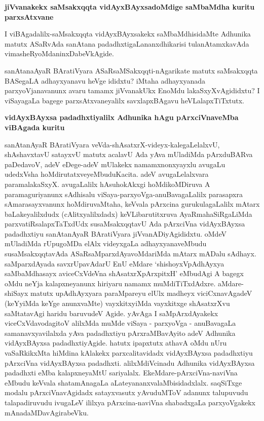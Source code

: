 {\bigskip
\noindent
{\large\bf jiVvanakekx saMsakxqqta vidAyxBAyxsadoMdige saMbaMdha kuritu parxsAtxvane}}\label{page38}
\medskip

\noindent
I viBAgadalilx-saMsakxqqta vidAyxBAyxsakekx saMbaMdhisidaMte Adhunika matutx ASaRvAda sanAtana padadhxti\-gaLa\-nanxdhi\-karisi tulanAtamxkavAda vimasheRyoMdaninxDabeVkAgide.

sanAtanaAyaR BAratiVyara ASaRsaMSakxqqti-nAgarikate matutx saMsakxqqta BASegaLA adhayxyanavu heVge ididxtu? iMtaha adhayxyanada parxyoVjanavanunx avaru tamamx jiVvanakUkx EnoMdu lakaSxyXvAgididxtu? I viSayagaLa bagege parxsAtxvaneyalilx savxlapxBAgavu heVLalapxTiTxtutx.

{\bigskip
\noindent
{\large\bf vidAyxBAyxsa padadhxtiyalilx Adhunika hAgu pArxciVnaveMba viBAgada kuritu}}\label{page38}
\medskip

\noindent
sanAtanAyaR BAratiVyara veVda-shAsatxrX-videyx-kalegaLelalxvU, shAshavxtavU satayxvU matutx acalavU Ada yAva mUladiMda pArxduBARva paDedavoV, adeV eDege\--adeV mUlakekx namamxnonxyayxlu avu\-gaLu udedxVsha hoMdirutatxveyeMbudu\break Kacita. adeV avugaLelalxvara paramalakaSxyX. avugaLalilx hAsu\-hokAkxgi hoMdikoMDi\-ruva A paramaguriyanunx sAdhisalu viSaya-parxyoVga-anuBavagaLalilx para\-sapxra sAma\-rasayx\-vanunx hoMdiruvaMtaha, keVvala pArxcina gurukulagaLalilx mAtarx baLake\-yalilxdudx (cAlitx\-yalilxdadx) keVLi\-baru\-titxruva AyaRmahaSiRgaLiMda parxvatiRsa\-lapxTaTxdUdx susaMsakxqqtavU Ada pArxciVna vidAyx\-BAyxsa padadhx\-tiyu sanAtanAyaR BAratiVyara jiVvanADiyAgididxtu. oMdeV mUladiMda rUpu\-goMDa elAlx videyxgaLa adhayx\-yanaveMbudu susaMsakxqqtavAda ASaRsaMparxdAyavoMdariMda mAtarx
mADalu sA\-dhayx. saMparx\-dAyada savxrUpavAdarU EnU eMdare `shishoyxVpAdhAyxya saMbaM\-dhasayx\label{38} aviceCxVdeVna shAsatxrX\-pArxpitxH' eMbu\-dAgi A bagegx oMdu neYja kalapxneyanunx hiri\-yaru namamx muMdiTiTxdAdxre. aMdare-shiSayx matutx upA\-dhAyxyara paraMpareyu elUlx madheyx viciCxnavAgadeV (keYyiMda keYge anunxvaMte) vayxkitxyiMda vayxkitxge shAsatxrXvu saMtatavAgi haridu baruvudeV Agide. yAvAga I saMpArxdAyakekx viceCxVda\-voda\-gitoV alilxMda muMde viSaya - parxyoVga - anuBavagaLa samanavxyavilalxda yAva padadhxtiyu pArxraMBa\-vAyito adeV Adhunika vidAyx\-BAyxsa padadhxtiyAgide. hatutx ipapxtutx athavA oMdu nUru vaSaR\-kikxMta hiMdina kAlakekx parxcalitavidadx vidAyx\-BAyxsa padadhxtiyu pArxciVna vidAyxBAyxsa padadhxti. alilxMdiVcinadu Adhu\-nika vidAyx\-BAyxsa padadhxti eMba kalapxneyaMtU sariyalalx. EkeMdare-pArxciVna-naviVna \hbox{eMbudu} \hbox{keVvala} shata\-mAna\-gaLa aLate\-yananxva\-laMbi\-sidadxlalx. saqSiTxge modalu pArxciVnavAgidadx satayxvasutx yAvu\-duMToV adanunx talupuvudu talapadiru\-vudu ivugaLeV ililxya pArxcina-naviVna shabadxgaLa parxyoVgakekx mAna\-daMDa\-vAgira\-beVku.

